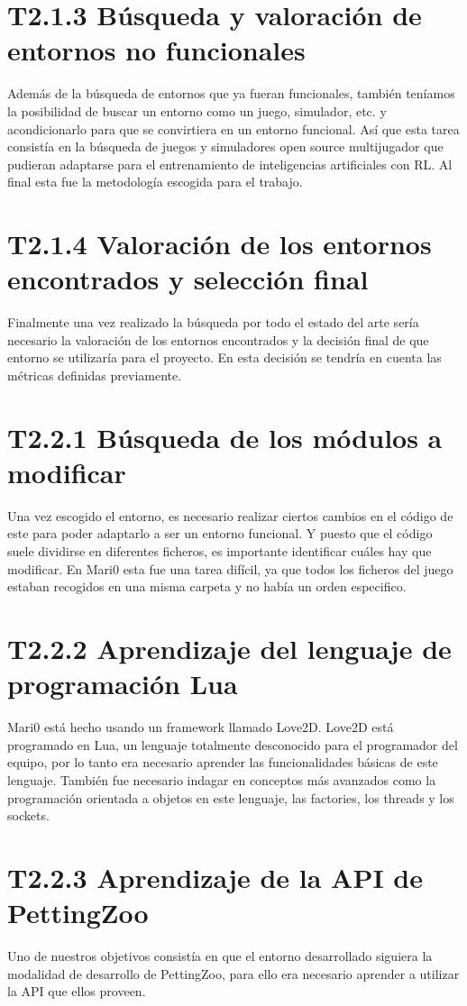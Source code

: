 \section*{T2.1.3 Búsqueda y valoración de entornos no funcionales}
Además de la búsqueda de entornos que ya fueran funcionales, también teníamos la posibilidad de buscar un entorno como un juego, simulador, etc. y acondicionarlo para que se convirtiera en un entorno funcional. Así que esta tarea consistía en la búsqueda de juegos y simuladores open source multijugador que pudieran adaptarse para el entrenamiento de inteligencias artificiales con RL. Al final esta fue la metodología escogida para el trabajo.

\section*{T2.1.4 Valoración de los entornos encontrados y selección final}
Finalmente una vez realizado la búsqueda por todo el estado del arte sería necesario la valoración de los entornos encontrados y la decisión final de que entorno se utilizaría para el proyecto. En esta decisión se tendría en cuenta las métricas definidas previamente.

\section*{T2.2.1 Búsqueda de los módulos a modificar}
Una vez escogido el entorno, es necesario realizar ciertos cambios en el código de este para poder adaptarlo a ser un entorno funcional. Y puesto que el código suele dividirse en diferentes ficheros, es importante identificar cuáles hay que modificar. En Mari0 esta fue una tarea difícil, ya que todos los ficheros del juego estaban recogidos en una misma carpeta y no había un orden especifico.

\section*{T2.2.2 Aprendizaje del lenguaje de programación Lua}
Mari0 está hecho usando un framework llamado Love2D. Love2D está programado en Lua, un lenguaje totalmente desconocido para el programador del equipo, por lo tanto era necesario aprender las funcionalidades básicas de este lenguaje. También fue necesario indagar en conceptos más avanzados como la programación orientada a objetos en este lenguaje, las factories, los threads y los sockets.

\section*{T2.2.3 Aprendizaje de la API de PettingZoo}
Uno de nuestros objetivos consistía en que el entorno desarrollado siguiera la modalidad de desarrollo de PettingZoo, para ello era necesario aprender a utilizar la API que ellos proveen.

